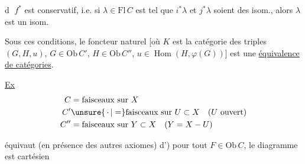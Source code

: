 

\textcircled{d} $f^*$ est conservatif, i.e. si $\lambda\in\mathrm{Fl}\,C$ est tel que $i^*\lambda$ et $j^*\lambda$ soient des isom., alors $\lambda$ est un isom.

Sous ces conditions, le foncteur naturel
[où $K$ est la  catégorie des triples $(G,H,u)$, $G\in\mathrm{Ob}\,C'$, $H\in\mathrm{Ob}\,C''$, $u\in\operatorname{Hom}(H,\varphi(G))$] est une \uline{équivalence de catégories}.

\uline{Ex} 
\[
\begin{aligned}
C&=\text{faisceaux sur }X\\
C'&\unsure{\,\cdot\,|=}\text{faisceaux sur } U\subset X\quad(U\text{ ouvert})\\
C''&=\text{faisceaux sur }Y\subset X\quad(Y=X-U)
\end{aligned}
\]

équivaut (en présence des autres axiomes)    d') pour tout $F\in\mathrm{Ob}\,C$, le diagramme
est cartésien

